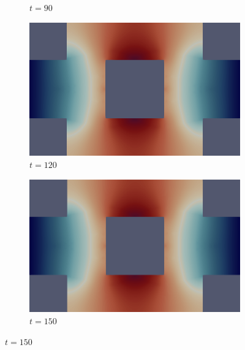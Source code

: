\begin{figure}[H]
\begin{subfigure}{.4\textwidth}
        \caption{$t = 90$}
    \end{subfigure}
    \begin{subfigure}{.4\textwidth}
        \includegraphics[width=\textwidth]{imgs/HeatSink_Solution/seventh.png}
        \caption{$t = 120$}
    \end{subfigure}
    \begin{subfigure}{.4\textwidth}
        \includegraphics[width=\textwidth]{imgs/HeatSink_Solution/eighth.png}
        \caption{$t = 150$}
    \end{subfigure}
\end{figure}

\vfill\pagebreak

